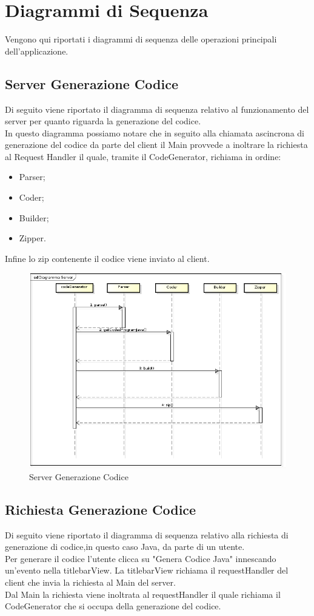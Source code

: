 \documentclass[../DefinizioneDiProdotto.tex]{subfiles}
\begin{document}
\section{Diagrammi di Sequenza}
Vengono qui riportati i diagrammi di sequenza delle operazioni principali dell'applicazione.
\subsection{Server Generazione Codice}
Di seguito viene riportato il diagramma di sequenza relativo al funzionamento del server per quanto riguarda la generazione del codice.\\
In questo diagramma possiamo notare che in seguito alla chiamata ascincrona di generazione del codice da parte del client il Main  provvede a inoltrare la richiesta al Request Handler il quale, tramite il CodeGenerator, richiama in ordine:
\begin{itemize}
	\item Parser;
	\item Coder;
	\item Builder;
	\item Zipper.
\end{itemize} 
Infine lo zip contenente il codice viene inviato al client.

\begin{figure}[H]\label{fig:Server}
	\centering
	\includegraphics[scale=0.46]{Immagini/DiagrammaCodice.png}
	\caption{Server Generazione Codice}
\end{figure}


\subsection{Richiesta Generazione Codice}
Di seguito viene riportato il diagramma di sequenza relativo alla richiesta di generazione di codice,in questo caso Java, da parte di un utente.\\
Per generare il codice l'utente clicca su "Genera Codice Java" innescando un'evento nella titlebarView.
La titlebarView richiama il requestHandler del client che invia la richiesta al Main del server.\\
Dal Main la richiesta viene inoltrata al requestHandler il quale richiama il CodeGenerator che si occupa della generazione del codice.
\end{document}
